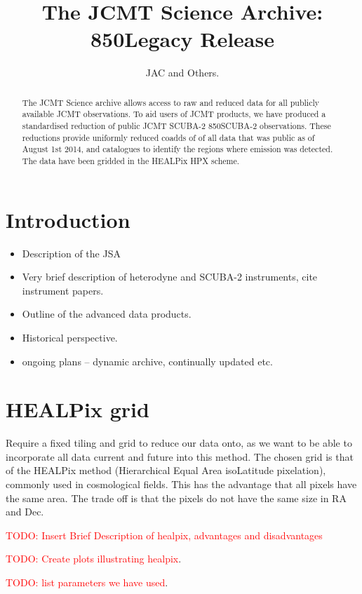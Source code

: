 \documentclass[usenatbib]{mn2e}
\title{The JCMT Science Archive: 850\micron Legacy Release}
\author{JAC and Others.}
\newcommand{\todo}[1]{\textcolor{red}{TODO: #1}}
\begin{document}
\maketitle

\begin{abstract}

  The JCMT Science archive allows access to raw and reduced data for
  all publicly available JCMT observations. To aid users of JCMT
  products, we have produced a standardised reduction of public JCMT
  SCUBA-2 850\micron SCUBA-2 observations. These reductions provide
  uniformly reduced coadds of of all data that was public as of August
  1st 2014, and catalogues to identify the regions where emission was
  detected. The data have been gridded in the HEALPix HPX scheme.
\end{abstract}

\section{Introduction}
\begin{itemize}
\item Description of the JSA
\item Very brief description of heterodyne and SCUBA-2 instruments, cite instrument papers.
\item Outline of the advanced data products.
\item Historical perspective.
\item ongoing plans -- dynamic archive, continually updated etc.
\end{itemize}



\section{HEALPix grid }
Require a fixed tiling and grid to reduce our data onto, as we want to be able to
incorporate all data current and future into this method. The chosen
grid is that of the HEALPix method (Hierarchical Equal Area
isoLatitude pixelation), commonly used in cosmological fields. This
has the advantage that all pixels have the same area. The trade off is
that the pixels do not have the same size in RA and Dec.

\todo{Insert Brief Description of healpix, advantages and
  disadvantages}

\todo{Create plots illustrating healpix}.

\todo{list parameters we have used}.
\end{document}
